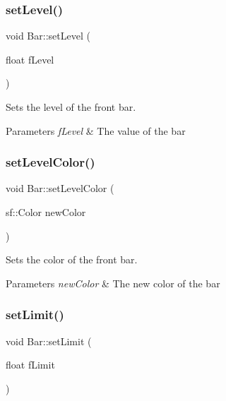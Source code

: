 \subsubsection{\texorpdfstring{set\+Level()}{setLevel()}}
{\footnotesize\ttfamily void Bar\+::set\+Level (\begin{DoxyParamCaption}\item[{float}]{f\+Level }\end{DoxyParamCaption})}



Sets the level of the front bar. 


\begin{DoxyParams}{Parameters}
{\em f\+Level} & The value of the bar \\
\hline
\end{DoxyParams}
\mbox{\label{class_bar_a7720107a020b81ded676dab4ade0179d}} 
\subsubsection{\texorpdfstring{set\+Level\+Color()}{setLevelColor()}}
{\footnotesize\ttfamily void Bar\+::set\+Level\+Color (\begin{DoxyParamCaption}\item[{sf\+::\+Color}]{new\+Color }\end{DoxyParamCaption})}



Sets the color of the front bar. 


\begin{DoxyParams}{Parameters}
{\em new\+Color} & The new color of the bar \\
\hline
\end{DoxyParams}
\mbox{\label{class_bar_a9a39051c7f17e2bf8b9c4661e34c8560}} 
\subsubsection{\texorpdfstring{set\+Limit()}{setLimit()}}
{\footnotesize\ttfamily void Bar\+::set\+Limit (\begin{DoxyParamCaption}\item[{float}]{f\+Limit }\end{DoxyParamCaption})}



